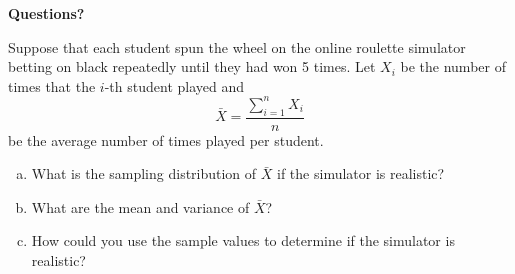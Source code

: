 \begin{frame}

  \begin{center}
    \Large{\textbf{Questions?}}
  \end{center}
\end{frame}

\begin{frame}

  \begin{block}{\exercise}
  Suppose that each student spun the wheel on the online roulette simulator betting on black repeatedly until they had won 5 times. Let $X_i$ be the number of times that the $i$-th student played and 
  $$
  \bar X = \frac{\sum_{i=1}^n X_i}{n}  
  $$
  be the average number of times played per student. 
  
  \begin{enumerate}[a)]
    \item What is the sampling distribution of $\bar X$ if the simulator is realistic?
    \item What are the mean and variance of $\bar X$?
    \item How could you use the sample values to determine if the simulator is realistic?
    \end{enumerate}
  \end{block}
\end{frame}

